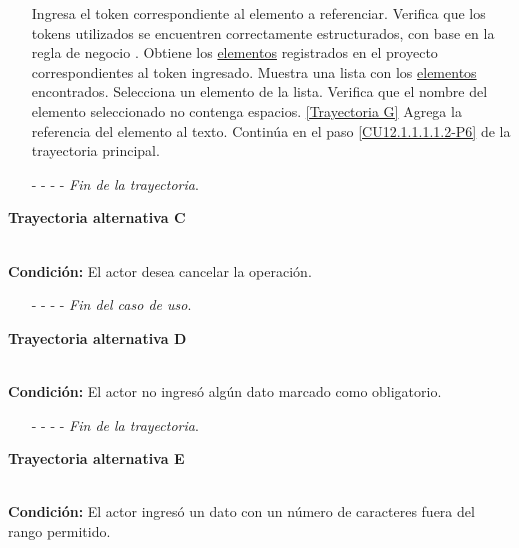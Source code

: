 \begin{enumerate}
	\UCpaso[\UCactor] Ingresa el token correspondiente al elemento a referenciar.
	\UCpaso[\UCsist] Verifica que los tokens utilizados se encuentren correctamente estructurados, con base en la regla de negocio . 
	\UCpaso[\UCsist] Obtiene los \hyperlink{tElemento}{elementos} registrados en el proyecto correspondientes al token ingresado. 
	\UCpaso[\UCsist] Muestra una lista con los \hyperlink{tElemento}{elementos} encontrados.
	\UCpaso[\UCactor] Selecciona un elemento de la lista.
	\UCpaso[\UCsist] Verifica que el nombre del elemento seleccionado no contenga espacios. \hyperlink{CU12-1-1-1-1-2:TAG}{[Trayectoria G]}
	\UCpaso[\UCsist] Agrega la referencia del elemento al texto. \label{CU12.1.1.1.1.2-TA1}
	\UCpaso Continúa en el paso \ref{CU12.1.1.1.1.2-P6} de la trayectoria principal.
	\item[- -] - - {\em {Fin de la trayectoria}}.%
\end{enumerate}
\hypertarget{CU12-1-1-1-1-2:TAC}{\textbf{Trayectoria alternativa C}}\\
\noindent \textbf{Condición:} El actor desea cancelar la operación.
\begin{enumerate}
	\UCpaso[\UCactor] Solicita cancelar la operación oprimiendo el botón  de la pantalla .
	\UCpaso[\UCsist] Muestra la pantalla .
	\item[- -] - - {\em {Fin del caso de uso}}.%
\end{enumerate}
\hypertarget{CU12-1-1-1-1-2:TAD}{\textbf{Trayectoria alternativa D}}\\
\noindent \textbf{Condición:} El actor no ingresó algún dato marcado como obligatorio.
\begin{enumerate}
	\UCpaso[\UCsist] Muestra el mensaje  señalando el campo que presenta el error en la pantalla .
	\UCpaso Regresa al paso \ref{CU12.1.1.1.1.2-P5} de la trayectoria principal.
	\item[- -] - - {\em {Fin de la trayectoria}}.%
\end{enumerate}
\hypertarget{CU12-1-1-1-1-2:TAE}{\textbf{Trayectoria alternativa E}}\\
\noindent \textbf{Condición:} El actor ingresó un dato con un número de caracteres fuera del rango permitido.
